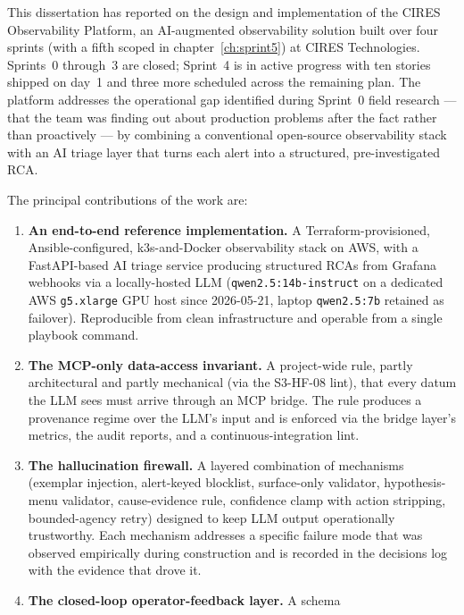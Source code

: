 \documentclass[11pt,a4paper,oneside]{report}
\begin{document}
This dissertation has reported on the design and implementation of
the CIRES Observability Platform, an AI-augmented observability
solution built over four sprints (with a fifth scoped in
chapter~\ref{ch:sprint5}) at CIRES Technologies.  Sprints~0
through~3 are closed; Sprint~4 is in active progress with ten
stories shipped on day~1 and three more scheduled across the
remaining plan.  The platform addresses the operational gap
identified during Sprint~0 field research --- that the team was
finding out about production problems after the fact rather than
proactively --- by combining a conventional open-source
observability stack with an AI triage layer that turns each alert
into a structured, pre-investigated RCA.

The principal contributions of the work are:

\begin{enumerate}
  \item \textbf{An end-to-end reference implementation.}  A
        Terraform-provisioned, Ansible-configured, k3s-and-Docker
        observability stack on AWS, with a FastAPI-based AI triage
        service producing structured RCAs from Grafana webhooks via
        a locally-hosted LLM (\texttt{qwen2.5:14b-instruct} on a
        dedicated AWS \texttt{g5.xlarge} GPU host since
        2026-05-21, laptop \texttt{qwen2.5:7b} retained as
        failover).  Reproducible from clean infrastructure and
        operable from a single playbook command.
  \item \textbf{The MCP-only data-access invariant.}  A project-wide
        rule, partly architectural and partly mechanical (via the
        S3-HF-08 lint), that every datum the LLM sees must arrive
        through an MCP bridge.  The rule produces a provenance
        regime over the LLM's input and is enforced via the bridge
        layer's metrics, the audit reports, and a continuous-integration
        lint.
  \item \textbf{The hallucination firewall.}  A layered combination
        of mechanisms (exemplar injection, alert-keyed blocklist,
        surface-only validator, hypothesis-menu validator,
        cause-evidence rule, confidence clamp with action stripping,
        bounded-agency retry) designed to keep LLM output
        operationally trustworthy.  Each mechanism addresses a
        specific failure mode that was observed empirically during
        construction and is recorded in the decisions log with the
        evidence that drove it.
  \item \textbf{The closed-loop operator-feedback layer.}  A schema

\end{enumerate}
\end{document}
